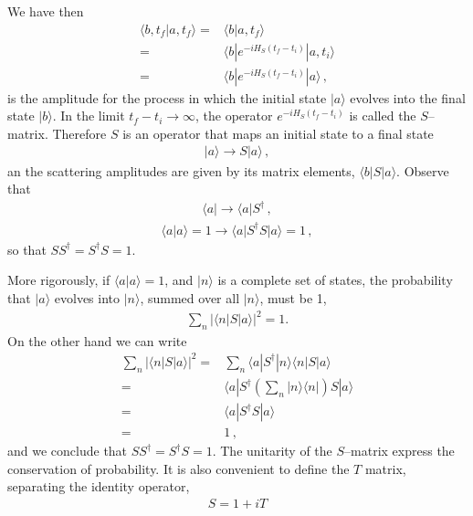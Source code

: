 We have then
\begin{align}
  \langle b,t_f|a,t_f\rangle=& \langle b|a,t_f\rangle\nonumber\\
=& \langle b|e^{-i H_S(t_f-t_i)}|a,t_i\rangle\nonumber\\
=& \langle b|e^{-i H_S(t_f-t_i)}|a\rangle\,,
\end{align}
is the amplitude for the process in which the initial state $|a\rangle$ evolves into the final state $|b\rangle$. In the limit $t_f-t_i\to\infty$, the operator  $e^{-i H_S(t_f-t_i)}$ is called the $S$--matrix. Therefore $S$ is an operator that maps an initial state to a final state
\begin{align}
  |a\rangle\to S|a\rangle\,,
\end{align}
an the scattering amplitudes are given by its matrix elements, $\langle b|S|a\rangle$. Observe that
\begin{align}
  \langle a|\to \langle a|S^\dagger\,,
\end{align}
\begin{align}
  \label{eq:40}
  \langle a|a\rangle=1\to \langle a|S^\dagger S|a\rangle=1\,,
\end{align}
so that $S S^\dagger=S^\dagger S =1$.

More rigorously, if $\langle a|a\rangle=1$, and $|n\rangle$ is a complete set of states, the probability that $|a\rangle$ evolves into $|n\rangle$, summed over all $|n\rangle$, must be 1,
\begin{align}
  \sum_n\left|\langle n|S|a\rangle\right|^2=1.
\end{align}
On the other hand we can write
\begin{align}
  \sum_n\left|\langle n|S|a\rangle\right|^2=&\sum_n\langle a|S^\dagger|n\rangle\langle n|S|a\rangle\nonumber\\
  =&\langle a|S^\dagger\left(\sum_n|n\rangle\langle n|\right)S|a\rangle\nonumber\\
  =&\langle a|S^\dagger S|a\rangle\nonumber\\
  =&1\,,
\end{align}
and we conclude that  $S S^\dagger=S^\dagger S =1$. The unitarity of the $S$--matrix express the conservation of probability. It is also convenient to define the $T$ matrix, separating the identity operator,
\begin{align}
  S=1+i T
\end{align}

